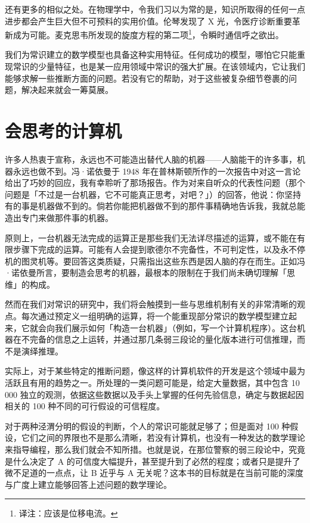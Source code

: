 还有更多的相似之处。在物理学中，令我们习以为常的是，知识所取得的任何一点进步都会产生巨大但不可预料的实用价值。伦琴发现了 X 光，令医疗诊断重要革新成为可能。麦克思韦所发现的旋度方程的第二项\footnote{译注：应该是位移电流。}，令瞬时通信呼之欲出。

我们为常识建立的数学模型也具备这种实用特征。任何成功的模型，哪怕它只能重现常识的少量特征，也是某一应用领域中常识的强大扩展。在该领域内，它让我们能够求解一些推断方面的问题。若没有它的帮助，对于这些被复杂细节卷裹的问题，解决起来就会一筹莫展。

\section{会思考的计算机}

许多人热衷于宣称，永远也不可能造出替代人脑的机器——人脑能干的许多事，机器永远也做不到。冯·诺依曼于 1948 年在普林斯顿所作的一次报告中对这一言论给出了巧妙的回应，我有幸聆听了那场报告。作为对来自听众的代表性问题（那个问题是「不过是一台机器，它不可能真正思考，对吧？」）的回答，他说：你坚持有的事是机器做不到的。倘若你能把机器做不到的那件事精确地告诉我，我就总能造出专门来做那件事的机器。

原则上，一台机器无法完成的运算正是那些我们无法详尽描述的运算，或不能在有限步骤下完成的运算。可能有人会提到歌德尔不完备性，不可判定性，以及永不停机的图灵机等。要回答这类质疑，只需指出这些东西是因人脑的存在而生。正如冯·诺依曼所言，要制造会思考的机器，最根本的限制在于我们尚未确切理解「思维」的构成。

然而在我们对常识的研究中，我们将会触摸到一些与思维机制有关的非常清晰的观点。每次通过预定义一组明确的运算，将一个能重现部分常识的数学模型建立起来，它就会向我们展示如何「构造一台机器」（例如，写一个计算机程序）。这台机器在不完备的信息之上运转，并通过那几条弱三段论的量化版本进行可信推理，而不是演绎推理。

实际上，对于某些特定的推断问题，像这样的计算机软件的开发是这个领域中最为活跃且有用的趋势之一。所处理的一类问题可能是，给定大量数据，其中包含 10 000 独立的观测，依据这些数据以及手头上掌握的任何先验信息，确定与数据起因相关的 100 种不同的可行假设的可信程度。

对于两种泾渭分明的假设的判断，个人的常识可能就足够了；但是面对 100 种假设，它们之间的界限也不是那么清晰，若没有计算机，也没有一种发达的数学理论来指导编程，那么我们就会不知所措。也就是说，在那位警察的弱三段论中，究竟是什么决定了 A 的可信度大幅提升，甚至提升到了必然的程度；或者只是提升了微不足道的一点点，让 B 近乎与 A 无关呢？这本书的目标就是在当前可能的深度与广度上建立能够回答上述问题的数学理论。


